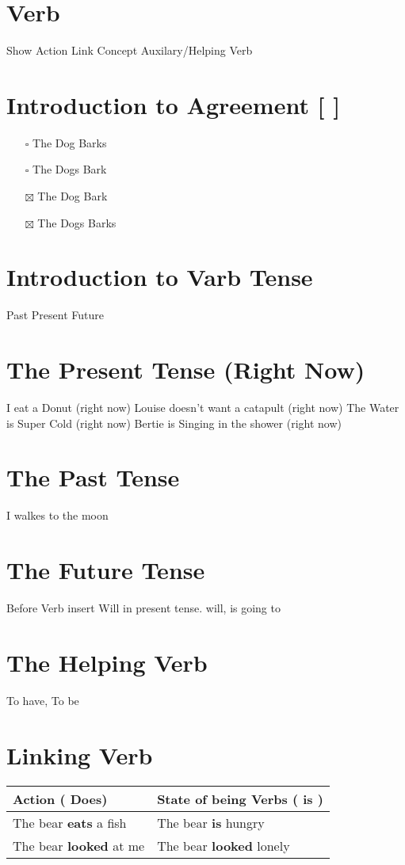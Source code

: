 \documentclass[11pt]{article}
\begin{document}
\section{Verb}
\label{sec:orgc824365}
Show Action
Link Concept
Auxilary/Helping Verb

\section{Introduction to Agreement [ ]}
\label{sec:orgdad3ba4}
\begin{itemize}
\item[{$\square$}] The Dog Barks
\item[{$\square$}] The Dogs Bark
\item[{$\boxtimes$}] The Dog Bark
\item[{$\boxtimes$}] The Dogs Barks
\end{itemize}

\section{Introduction to Varb Tense}
\label{sec:orgfedf1af}
Past Present Future

\section{The Present Tense (Right Now)}
\label{sec:org128e5f2}
I eat a Donut (right now)
Louise doesn't want a catapult (right now)
The Water is Super Cold (right now)
Bertie is Singing in the shower (right now)

\section{The Past Tense}
\label{sec:orgdb0ccf1}
I walkes to the moon

\section{The Future Tense}
\label{sec:org1ef1dbf}
Before Verb insert Will in present tense.
will, is going to

\section{The Helping Verb}
\label{sec:org5fb59a7}
To have, To be

\section{Linking Verb}
\label{sec:org25347e8}
\begin{center}
\begin{tabular}{ll}
Action ( Does) & State of being Verbs ( is )\\
\hline
The bear \textbf{eats} a fish & The bear \textbf{is} hungry\\
The bear \textbf{looked} at me & The bear \textbf{looked} lonely\\
\end{tabular}
\end{center}
\end{document}
